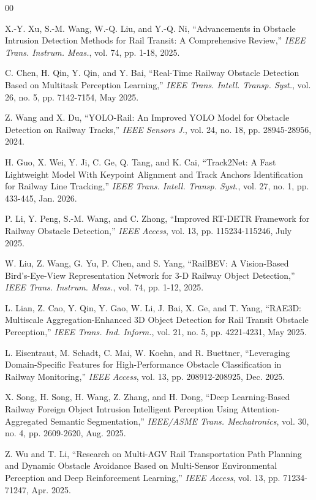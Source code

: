 \documentclass[conference]{IEEEtran}
\begin{document}
\begin{thebibliography}{00}

 X.-Y. Xu, S.-M. Wang, W.-Q. Liu, and Y.-Q. Ni, ``Advancements in Obstacle Intrusion Detection Methods for Rail Transit: A Comprehensive Review,'' \textit{IEEE Trans. Instrum. Meas.}, vol. 74, pp. 1-18, 2025.

 C. Chen, H. Qin, Y. Qin, and Y. Bai, ``Real-Time Railway Obstacle Detection Based on Multitask Perception Learning,'' \textit{IEEE Trans. Intell. Transp. Syst.}, vol. 26, no. 5, pp. 7142-7154, May 2025.

 Z. Wang and X. Du, ``YOLO-Rail: An Improved YOLO Model for Obstacle Detection on Railway Tracks,'' \textit{IEEE Sensors J.}, vol. 24, no. 18, pp. 28945-28956, 2024.

 H. Guo, X. Wei, Y. Ji, C. Ge, Q. Tang, and K. Cai, ``Track2Net: A Fast Lightweight Model With Keypoint Alignment and Track Anchors Identification for Railway Line Tracking,'' \textit{IEEE Trans. Intell. Transp. Syst.}, vol. 27, no. 1, pp. 433-445, Jan. 2026.

 P. Li, Y. Peng, S.-M. Wang, and C. Zhong, ``Improved RT-DETR Framework for Railway Obstacle Detection,'' \textit{IEEE Access}, vol. 13, pp. 115234-115246, July 2025.

 W. Liu, Z. Wang, G. Yu, P. Chen, and S. Yang, ``RailBEV: A Vision-Based Bird's-Eye-View Representation Network for 3-D Railway Object Detection,'' \textit{IEEE Trans. Instrum. Meas.}, vol. 74, pp. 1-12, 2025.

 L. Lian, Z. Cao, Y. Qin, Y. Gao, W. Li, J. Bai, X. Ge, and T. Yang, ``RAE3D: Multiscale Aggregation-Enhanced 3D Object Detection for Rail Transit Obstacle Perception,'' \textit{IEEE Trans. Ind. Inform.}, vol. 21, no. 5, pp. 4221-4231, May 2025.

 L. Eisentraut, M. Schadt, C. Mai, W. Koehn, and R. Buettner, ``Leveraging Domain-Specific Features for High-Performance Obstacle Classification in Railway Monitoring,'' \textit{IEEE Access}, vol. 13, pp. 208912-208925, Dec. 2025.

 X. Song, H. Song, H. Wang, Z. Zhang, and H. Dong, ``Deep Learning-Based Railway Foreign Object Intrusion Intelligent Perception Using Attention-Aggregated Semantic Segmentation,'' \textit{IEEE/ASME Trans. Mechatronics}, vol. 30, no. 4, pp. 2609-2620, Aug. 2025.

 Z. Wu and T. Li, ``Research on Multi-AGV Rail Transportation Path Planning and Dynamic Obstacle Avoidance Based on Multi-Sensor Environmental Perception and Deep Reinforcement Learning,'' \textit{IEEE Access}, vol. 13, pp. 71234-71247, Apr. 2025.

\end{thebibliography}
\end{document}
